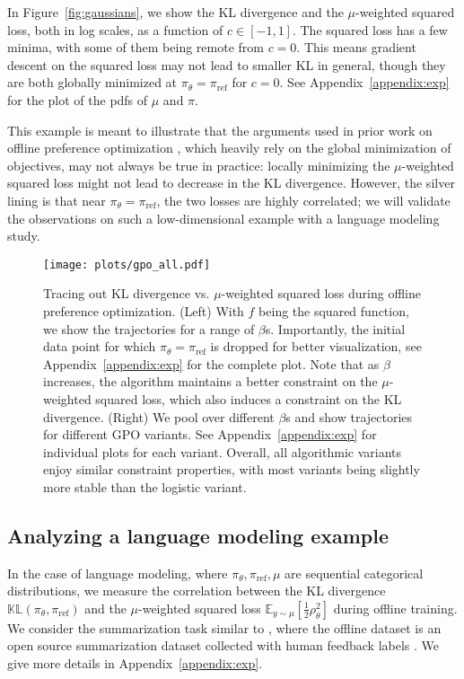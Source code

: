 In Figure~\ref{fig:gaussians}, we show the KL divergence and the $\mu$-weighted squared loss, both in log scales, as a function of $c\in[-1,1]$. The squared loss has a few minima, with some of them being remote from $c=0$. This means gradient descent on the squared loss may not lead to smaller KL in general, though they are both globally minimized at $\pi_\theta=\pi_\text{ref}$ for $c=0$. See Appendix~\ref{appendix:exp} for the plot of the pdfs of $\mu$ and $\pi$.

This example is meant to illustrate that the arguments used in prior work on offline preference optimization \citep{rafailov2023direct}, which heavily rely on the global minimization of objectives, may not always be true in practice: locally minimizing the $\mu$-weighted squared loss might not lead to decrease in the KL divergence. However, the silver lining is that near $\pi_\theta=\pi_\text{ref}$, the two losses are highly correlated; we will validate the observations on such a low-dimensional example with a language modeling study.

\begin{figure*}[t]
    \centering
    \texttt{[image: plots/gpo\_all.pdf]}
    \caption{\small{Tracing out KL divergence vs. $\mu$-weighted squared loss during offline preference optimization. (Left) With $f$ being the squared function, we show the trajectories for a range of $\beta$s. Importantly, the initial data point for which $\pi_\theta=\pi_\text{ref}$ is dropped for better visualization, see Appendix~\ref{appendix:exp} for the complete plot. Note that as $\beta$ increases, the algorithm maintains a better constraint on the $\mu$-weighted squared loss, which also induces a constraint on the KL divergence. (Right) We pool over different $\beta$s and show trajectories for different GPO variants. See Appendix~\ref{appendix:exp} for individual plots for each variant. Overall, all algorithmic variants enjoy similar constraint properties, with most variants being slightly more stable than the logistic variant.}}
    \label{fig:gpo-all}
\end{figure*}

\subsection{Analyzing a language modeling example}

In the case of language modeling, where $\pi_\theta,\pi_\text{ref},\mu$ are sequential categorical distributions, we measure the correlation between the KL divergence $\mathbb{KL}\left(\pi_\theta,\pi_\text{ref}\right)$ and the $\mu$-weighted squared loss $\mathbb{E}_{y\sim\mu}\left[\frac{1}{2}\rho_\theta^2\right]$ during offline training. We consider the summarization task similar to \citep{roit2023factually}, where the offline dataset is an open source summarization dataset collected with human feedback labels \citep{stiennon2020learning}. We give more details in Appendix~\ref{appendix:exp}.

